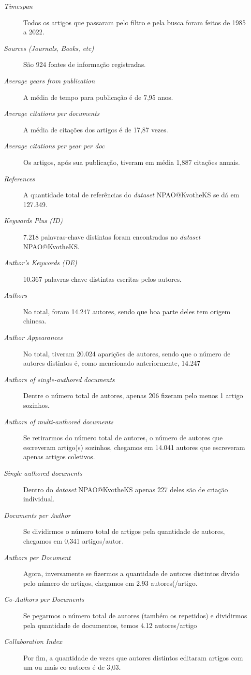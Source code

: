 \begin{description}
    \item [\textit{Timespan}] Todos os artigos que passaram pelo filtro e pela busca foram feitos de 1985 a 2022.
    \item [\textit{Sources (Journals, Books, etc)}] São 924 fontes de informação registradas.
    \item [\textit{Average years from publication}] A média de tempo para publicação é de 7,95 anos.
    \item [\textit{Average citations per documents}] A média de citações dos artigos é de 17,87 vezes.
    \item [\textit{Average citations per year per doc}] Os artigos, após sua publicação, tiveram em média 1,887 citações anuais.
    \item [\textit{References}] A quantidade total de referências do \emph{dataset} NPAO@KvotheKS se dá em 127.349.
    \item [\textit{Keywords Plus (ID)}] 7.218 palavras-chave distintas foram encontradas no \emph{dataset} NPAO@KvotheKS.
    \item [\textit{Author's Keywords (DE)}] 10.367 palavras-chave distintas escritas pelos autores.
    \item [\textit{Authors}] No total, foram 14.247 autores, sendo que boa parte deles tem origem chinesa.
    \item [\textit{Author Appearances}] No total, tiveram 20.024 aparições de autores, sendo que o número de autores distintos é, como mencionado anteriormente, 14.247
    \item [\textit{Authors of single-authored documents}] Dentre o número total de autores, apenas 206 fizeram pelo menos 1 artigo sozinhos.
    \item [\textit{Authors of multi-authored documents}] Se retirarmos do número total de autores, o número de autores que escreveram artigo(s) sozinhos, chegamos em 14.041 autores que escreveram apenas artigos coletivos.
    \item [\textit{Single-authored documents}] Dentro do \emph{dataset} NPAO@KvotheKS apenas 227 deles são de criação individual.
    \item [\textit{Documents per Author}] Se dividirmos o número total de artigos pela quantidade de autores, chegamos em 0,341 artigos/autor.
    \item [\textit{Authors per Document}] Agora, inversamente se fizermos a quantidade de autores distintos divido pelo número de artigos, chegamos em 2,93 autores(/artigo.
    \item [\textit{Co-Authors per Documents}] Se pegarmos o número total de autores (também os repetidos) e dividirmos pela quantidade de documentos, temos 4.12 autores/artigo
    \item [\textit{Collaboration Index}] Por fim, a quantidade de vezes que autores distintos editaram artigos com um ou mais co-autores é de 3,03.
\end{description}
